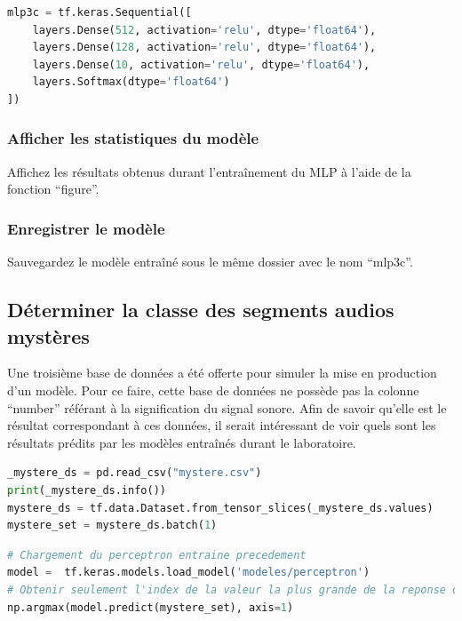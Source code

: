 \documentclass{article}
\begin{document}
\begin{lstlisting}[language=Python, caption={Correction de la disparition du gradient}, label={code:vanish_grad}]
mlp3c = tf.keras.Sequential([
    layers.Dense(512, activation='relu', dtype='float64'),
    layers.Dense(128, activation='relu', dtype='float64'),
    layers.Dense(10, activation='relu', dtype='float64'),
    layers.Softmax(dtype='float64')
])
\end{lstlisting}

\subsubsection{Afficher les statistiques du modèle}
Affichez les résultats obtenus durant l'entraînement du MLP à l'aide de la fonction ``figure''.
\subsubsection{Enregistrer le modèle}
Sauvegardez le modèle entraîné sous le même dossier avec le nom ``mlp3c''.

\subsection{Déterminer la classe des segments audios mystères}
Une troisième base de données a été offerte pour simuler la mise en production d'un modèle. Pour ce faire, cette base de données ne possède pas la colonne ``number'' référant à la signification du signal sonore. Afin de savoir qu'elle est le résultat correspondant à ces données, il serait intéressant de voir quels sont les résultats prédits par les modèles entraînés durant le laboratoire.

\begin{lstlisting}[language=Python, caption={Chargement de la base de données mystères}, label={code:load_data}]
_mystere_ds = pd.read_csv("mystere.csv")
print(_mystere_ds.info())
mystere_ds = tf.data.Dataset.from_tensor_slices(_mystere_ds.values)
mystere_set = mystere_ds.batch(1)
\end{lstlisting}

\begin{lstlisting}[language=Python, caption={Chargement du perceptron}, label={code:load_model}]
# Chargement du perceptron entraine precedement
model =  tf.keras.models.load_model('modeles/perceptron')
# Obtenir seulement l'index de la valeur la plus grande de la reponse du modele
np.argmax(model.predict(mystere_set), axis=1)
\end{lstlisting}
\end{document}
